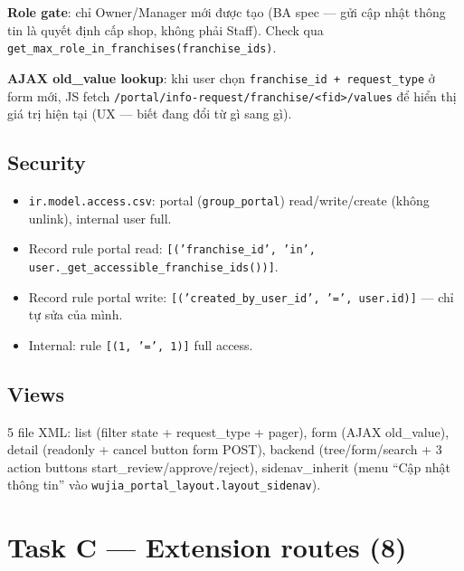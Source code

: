 \textbf{Role gate}: chỉ Owner/Manager mới được tạo (BA spec --- gửi cập nhật thông tin là quyết định cấp shop, không phải Staff). Check qua \texttt{get\_max\_role\_in\_franchises(franchise\_ids)}.

\textbf{AJAX old\_value lookup}: khi user chọn \texttt{franchise\_id + request\_type} ở form mới, JS fetch \texttt{/portal/info-request/franchise/<fid>/values} để hiển thị giá trị hiện tại (UX --- biết đang đổi từ gì sang gì).

\subsection{Security}

\begin{itemize}[leftmargin=*]
    \item \texttt{ir.model.access.csv}: portal (\texttt{group\_portal}) read/write/create (không unlink), internal user full.
    \item Record rule portal read: \texttt{[('franchise\_id', 'in', user.\_get\_accessible\_franchise\_ids())]}.
    \item Record rule portal write: \texttt{[('created\_by\_user\_id', '=', user.id)]} --- chỉ tự sửa của mình.
    \item Internal: rule \texttt{[(1, '=', 1)]} full access.
\end{itemize}

\subsection{Views}

5 file XML: list (filter state + request\_type + pager), form (AJAX old\_value), detail (readonly + cancel button form POST), backend (tree/form/search + 3 action buttons start\_review/approve/reject), sidenav\_inherit (menu ``Cập nhật thông tin'' vào \texttt{wujia\_portal\_layout.layout\_sidenav}).

\section{Task C --- Extension routes (8)}

